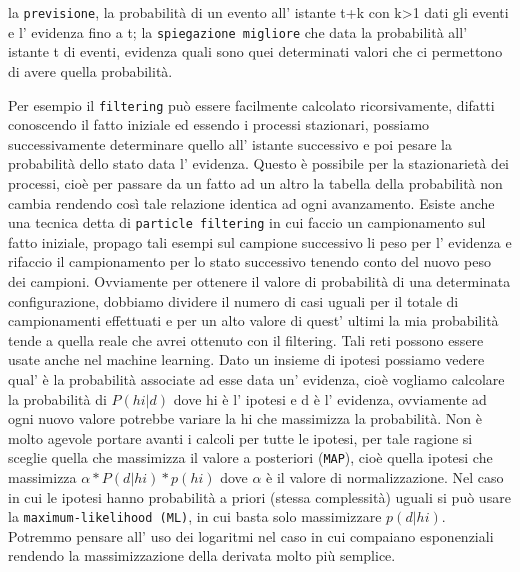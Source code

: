 		la \texttt{previsione}, la probabilità di un evento all' istante t+k con k>1 dati gli eventi e l' evidenza fino a t;
		la \texttt{spiegazione migliore} che data la probabilità all' istante t di eventi, evidenza quali sono quei determinati valori che ci permettono di avere quella probabilità.
		\par 
		Per esempio il \texttt{filtering} può essere facilmente calcolato ricorsivamente, difatti conoscendo il fatto iniziale ed essendo i processi stazionari, possiamo successivamente determinare quello all' istante successivo e poi pesare la probabilità dello stato data l' evidenza.
		Questo è possibile per la stazionarietà dei processi, cioè per passare da un fatto ad un altro la tabella della probabilità non cambia rendendo così tale relazione identica ad ogni avanzamento.
		Esiste anche una tecnica detta di \texttt{particle filtering} in cui faccio un campionamento sul fatto iniziale, propago tali esempi sul campione successivo li peso per l' evidenza e rifaccio il campionamento per lo stato successivo tenendo conto del nuovo peso dei campioni. Ovviamente per ottenere il valore di probabilità di una determinata configurazione, dobbiamo dividere il numero di casi uguali per il totale di campionamenti effettuati e per un alto valore di quest' ultimi la mia probabilità tende a quella reale che avrei ottenuto con il filtering. Tali reti possono essere usate anche nel machine learning. Dato un insieme di ipotesi possiamo vedere qual' è la probabilità associate ad esse data un' evidenza, cioè vogliamo calcolare la probabilità di $P(hi|d)$ dove hi è l' ipotesi e d è l' evidenza, ovviamente ad ogni nuovo valore potrebbe variare la hi che massimizza la probabilità. Non è molto agevole portare avanti i calcoli per tutte le ipotesi, per tale ragione si sceglie quella che massimizza il valore a posteriori (\texttt{MAP}), cioè quella ipotesi che massimizza $\alpha*P(d|hi)*p(hi)$ dove $\alpha$ è il valore di normalizzazione. Nel caso in cui le ipotesi hanno probabilità a priori (stessa complessità) uguali si può usare la \texttt{maximum-likelihood (ML)}, in cui basta solo massimizzare $p(d|hi)$.
		Potremmo pensare all' uso dei logaritmi nel caso in cui compaiano esponenziali rendendo la massimizzazione della derivata molto più semplice.
		
